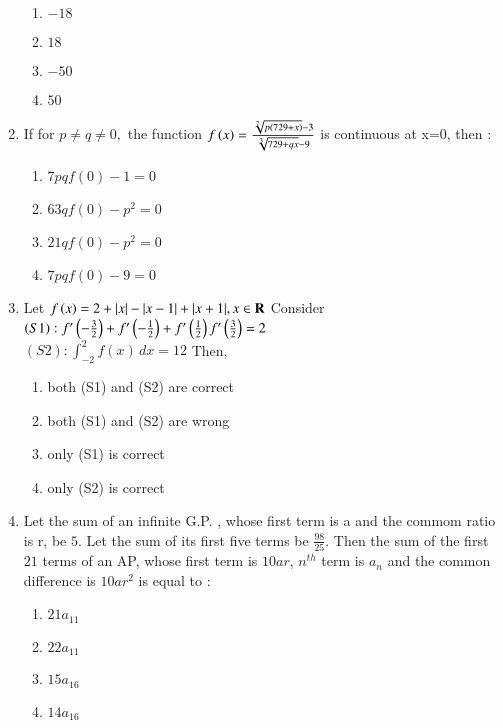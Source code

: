 \documentclass[journal]{IEEEtran}
\begin{document}
\begin{enumerate}
     \begin{enumerate}
         \item $-18$ 
         \item $18$ 
         \item $-50$ 
         \item $50$     
     \end{enumerate}


     \item If for $p \neq q \neq 0,$ the function $f\left(x\right) =\frac{\sqrt[7]{p(729 + x)}-3}{\sqrt[3]{729 +qx} -9}  $ is continuous at x=0, then :
     \begin{enumerate}
         \item $7pqf(0)- 1 =0$
         \item $63qf(0)- p^2 =0$
         \item $21qf(0) - p^2 =0$
         \item $7pqf(0)-9 = 0$
     \end{enumerate}


     \item Let $f\left(x\right) =2 + |x| - |x-1| + |x+1|, x \in \textbf{R} $ Consider\\
     $(S1): f^\prime\left(-{\frac{3}{2}}\right) + f^\prime\left(-{\frac{1}{2}}\right) + f^\prime\left({\frac{1}{2}}\right) f^\prime\left({\frac{3}{2}}\right) = 2$\\
     $(S2) : \int_{-2}^2 f(x) \, dx = 12$ Then,
     \begin{enumerate}
         \item both (S1) and (S2) are correct 
         \item both (S1) and (S2) are wrong 
         \item only (S1) is correct 
        \item only (S2) is correct 
     \end{enumerate}


     \item Let the sum of an infinite G.P. , whose first term is a and the commom ratio is r, be $5$. Let the sum of its first five terms be $\frac{98}{25}.$ Then the sum of the first $21$ terms of an AP, whose first term is $10ar$, $n^{th}$ term is $a_n$ and the common difference is $10ar^{2}$ is equal to :
     \begin{enumerate}
         \item $21a_{11}$
         \item $22a_{11}$
         \item $15a_{16}$
         \item $14 a_{16}$
    \end{enumerate}



\end{enumerate}
\end{document}
